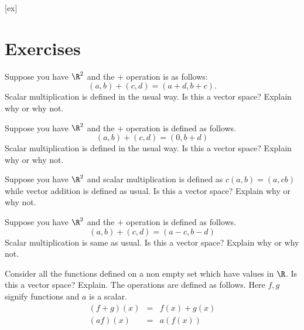 [ex]
\section*{Exercises}

\begin{enumialphparenastyle}

\begin{ex} Suppose you have $\R^{2}$ and the $+$ operation is as
follows:\ 
\begin{equation*}
\left( a,b\right) +\left( c,d\right) =\left( a+d,b+c\right) .
\end{equation*}
Scalar multiplication is defined in the usual way. Is this a vector space?
Explain why or why not. 
\end{ex}

\begin{ex} Suppose you have $\R^{2}$ and the $+$ operation is defined as
follows. 
\begin{equation*}
\left( a,b\right) +\left( c,d\right) =\left( 0,b+d\right)
\end{equation*}
Scalar multiplication is defined in the usual way. Is this a vector space?
Explain why or why not. 
\end{ex}

\begin{ex} Suppose you have $\R^{2}$ and scalar multiplication is defined
as $c\left( a,b\right) =\left( a,cb\right) $ while vector addition is
defined as usual. Is this a vector space? Explain why or why not.
\end{ex}

\begin{ex} Suppose you have $\R^{2}$ and the $+$ operation is defined as
follows. 
\begin{equation*}
\left( a,b\right) +\left( c,d\right) =\left( a-c,b-d\right)
\end{equation*}
Scalar multiplication is same as usual. Is this a vector space? Explain why
or why not. 
\end{ex}

\begin{ex} \label{functions}Consider all the functions defined on a non empty set
which have values in $\R$. Is this a vector space? Explain.
The operations are defined as follows. Here $f,g$ signify functions and $a$
is a scalar. 
\begin{eqnarray*}
\left( f+g\right) \left( x\right) &=&f\left( x\right) +g\left( x\right) \\
\left( af\right) \left( x\right) &=&a\left( f\left( x\right) \right)
\end{eqnarray*}
\end{ex}



\end{enumialphparenastyle}
